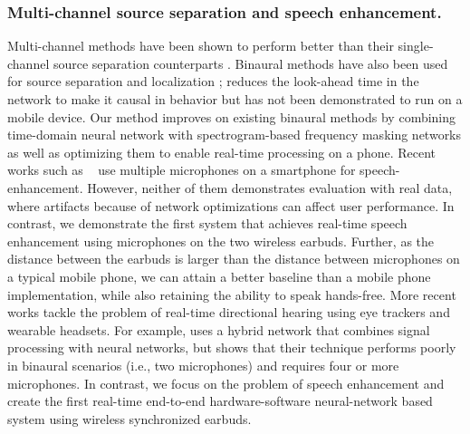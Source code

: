 \documentclass [11pt, proquest] {uwthesis}[2020/02/24]
\begin{document}
\subsubsection{Multi-channel source separation and speech enhancement.}
Multi-channel methods have been shown to perform better than their single-channel source separation counterparts \cite{yoshioka2018multi, chen2018multi, zhang2017deep, gu2020enhancing, tzirakis2021multichannel, jenrungrot2020cone}. Binaural methods have also been used for source separation \cite{binaural1, han2020realtime, li2011two, reindl2010speech} and localization \cite{van2008binaural, lyon1983computational, kock1950binaural}; \cite{han2020realtime} reduces the look-ahead time in the network to make it causal in behavior but has not been demonstrated to run on a mobile device.  Our method improves on existing binaural methods by combining time-domain neural network with spectrogram-based frequency masking networks as well as optimizing them to enable   real-time processing on a phone. Recent works such as ~\cite{binaural_osu, dual_phone,binauralphone} use multiple microphones on a smartphone for  speech-enhancement. However, neither of them demonstrates evaluation with real data, where artifacts because of network optimizations can affect user performance.
In contrast, we demonstrate the first system that achieves real-time speech enhancement using microphones on the two wireless earbuds. Further, as the distance between the earbuds is larger than the distance between microphones on a typical mobile phone, we can  attain a better baseline than a mobile phone implementation, while also retaining the ability to speak hands-free. More recent  works tackle the problem of real-time directional hearing using eye trackers and wearable headsets. For example,  \cite{hybridbeam} uses a hybrid network that combines signal processing with neural networks, but shows that their technique performs poorly in binaural scenarios (i.e., two microphones) and requires four or more microphones. In contrast, we focus on the problem of speech enhancement and create the first real-time end-to-end hardware-software neural-network based system using wireless synchronized earbuds. 
\end{document}
